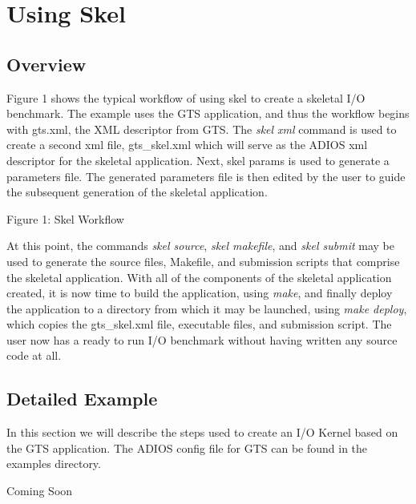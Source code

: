 \chapter{Using Skel}
\section{Overview}
Figure 1 shows the typical workflow of using skel to create a skeletal I/O 
benchmark. The example uses the GTS application, and thus the workflow begins
with gts.xml, the XML descriptor from GTS. The {\it skel xml} command is used
to create a second xml file, gts\_skel.xml which will serve as the ADIOS xml
descriptor for the skeletal application. Next, skel params is used to generate
a parameters file. The generated parameters file is then edited by the user to
guide the subsequent generation of the skeletal application.

Figure 1: Skel Workflow

At this point, the commands {\it skel source}, {\it skel makefile}, and {\it skel submit}
may be used to generate the source files, Makefile, and submission scripts that
comprise the skeletal application. With all of the components of the skeletal
application created, it is now time to build the application, using {\it make}, and
finally deploy the application to a directory from which it may be launched,
using {\it make deploy}, which copies the gts\_skel.xml file, executable files, and
submission script. The user now has a ready to run I/O benchmark without
having written any source code at all.


\section{Detailed Example}
In this section we will describe the steps used to create an I/O Kernel based
on the GTS application. The ADIOS config file for GTS can be found in the
examples directory.

Coming Soon
